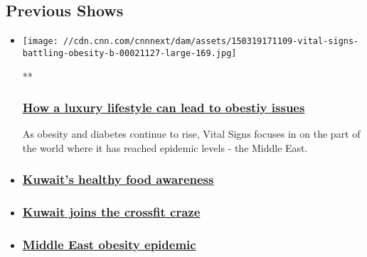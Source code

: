 \hypertarget{previous-shows-}{%
\subsection{Previous Shows~}\label{previous-shows-}}

\begin{itemize}
\item
  \href{/videos/intl_tv-shows/2015/03/19/vital-signs-battling-obesity-b.cnn}{}

  \texttt{[image: //cdn.cnn.com/cnnnext/dam/assets/150319171109-vital-signs-battling-obesity-b-00021127-large-169.jpg]}

  **

  \hypertarget{how-a-luxury-lifestyle-can-lead-to-obestiy-issues}{%
  \subsubsection{\texorpdfstring{\href{/videos/intl_tv-shows/2015/03/19/vital-signs-battling-obesity-b.cnn}{How
  a luxury lifestyle can lead to obestiy
  issues}}{How a luxury lifestyle can lead to obestiy issues}}\label{how-a-luxury-lifestyle-can-lead-to-obestiy-issues}}

  As obesity and diabetes continue to rise, Vital Signs focuses in on
  the part of the world where it has reached epidemic levels - the
  Middle East.
\item
  \hypertarget{kuwaits-healthy-food-awareness}{%
  \subsubsection{\texorpdfstring{\href{/videos/intl_tv-shows/2015/03/19/vital-signs-battling-obesity-c.cnn}{Kuwait's
  healthy food
  awareness}}{Kuwait's healthy food awareness}}\label{kuwaits-healthy-food-awareness}}
\item
  \hypertarget{kuwait-joins-the-crossfit-craze}{%
  \subsubsection{\texorpdfstring{\href{/videos/tv/2015/03/25/spc-kuwait-crossfit-vital-signs.cnn}{Kuwait
  joins the crossfit
  craze}}{Kuwait joins the crossfit craze}}\label{kuwait-joins-the-crossfit-craze}}
\item
  \hypertarget{middle-east-obesity-epidemic}{%
  \subsubsection{\texorpdfstring{\href{/2015/03/26/health/middle-east-obesity-diabetes-epidemic/index.html}{Middle
  East obesity
  epidemic}}{Middle East obesity epidemic}}\label{middle-east-obesity-epidemic}}
\end{itemize}

